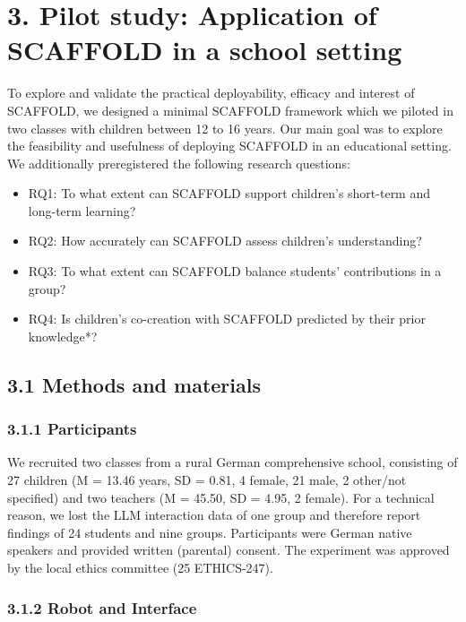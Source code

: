 \documentclass[fleqn,10pt]{wlscirep}
\begin{document}
\section*{3. Pilot study: Application of SCAFFOLD in a school setting}

To explore and validate the practical deployability, efficacy and interest of SCAFFOLD, we designed a minimal SCAFFOLD framework which we piloted in two classes with children between 12 to 16 years. Our main goal was to explore the feasibility and usefulness of deploying SCAFFOLD in an educational setting. We additionally preregistered the following research questions:

\begin{itemize}
\item RQ1: To what extent can SCAFFOLD support children's short-term and long-term learning?
\item RQ2: How accurately can SCAFFOLD assess children's understanding?
\item RQ3: To what extent can SCAFFOLD balance students' contributions in a group?
\item RQ4: Is children's co-creation with SCAFFOLD predicted by their prior knowledge*?
\end{itemize}

\subsection*{3.1 Methods and materials}

\subsubsection*{3.1.1 Participants}

We recruited two classes from a rural German comprehensive school, consisting of 27 children (M = 13.46 years, SD = 0.81, 4 female, 21 male, 2 other/not specified) and two teachers (M = 45.50, SD = 4.95, 2 female). For a technical reason, we lost the LLM interaction data of one group and therefore report findings of 24 students and nine groups. Participants were German native speakers and provided written (parental) consent. The experiment was approved by the local ethics committee (25 ETHICS-247).

\subsubsection*{3.1.2 Robot and Interface}
\end{document}
